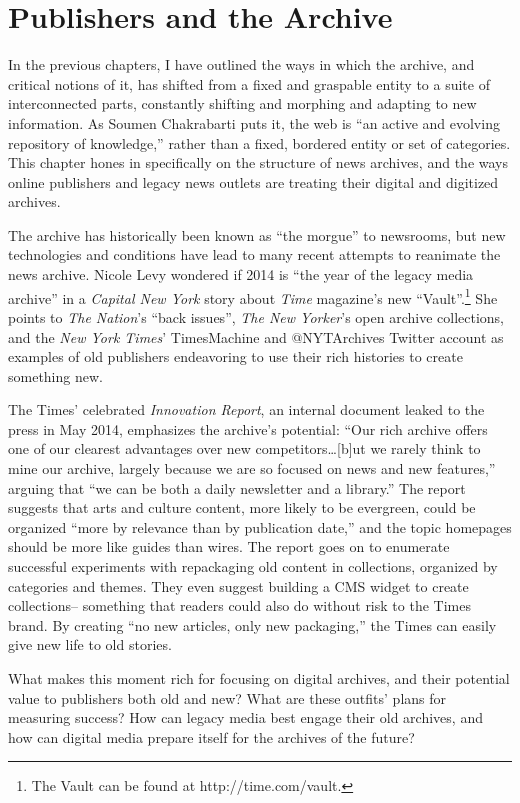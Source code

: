\chapter{Publishers and the Archive}

In the previous chapters, I have outlined the ways in which the archive, and critical notions of it, has shifted from a fixed and graspable entity to a suite of interconnected parts, constantly shifting and morphing and adapting to new information. As Soumen Chakrabarti puts it, the web is ``an active and evolving repository of knowledge,'' rather than a fixed, bordered entity or set of categories. This chapter hones in specifically on the structure of news archives, and the ways online publishers and legacy news outlets are treating their digital and digitized archives.

The archive has historically been known as ``the morgue'' to newsrooms, but new technologies and conditions have lead to many recent attempts to reanimate the news archive. Nicole Levy wondered if 2014 is ``the year of the legacy media archive'' in a \emph{Capital New York} story about \emph{Time} magazine's new ``Vault''.\footnote{The Vault can be found at http://time.com/vault.} She points to \emph{The Nation}'s ``back issues'', \emph{The New Yorker}'s open archive collections, and the \emph{New York Times}' TimesMachine and @NYTArchives Twitter account as examples of old publishers endeavoring to use their rich histories to create something new.\autocite{}

The Times' celebrated \emph{Innovation Report}, an internal document leaked to the press in May 2014, emphasizes the archive's potential: ``Our rich archive offers one of our clearest advantages over new competitors\ldots[b]ut we rarely think to mine our archive, largely because we are so focused on news and new features,'' arguing that ``we can be both a daily newsletter and a library.'' The report suggests that arts and culture content, more likely to be evergreen, could be organized ``more by relevance than by publication date,'' and the topic homepages should be more like guides than wires. The report goes on to enumerate successful experiments with repackaging old content in collections, organized by categories and themes. They even suggest building a CMS widget to create collections-- something that readers could also do without risk to the Times brand. By creating ``no new articles, only new packaging,'' the Times can easily give new life to old stories.

What makes this moment rich for focusing on digital archives, and their potential value to publishers both old and new? What are these outfits' plans for measuring success? How can legacy media best engage their old archives, and how can digital media prepare itself for the archives of the future?

